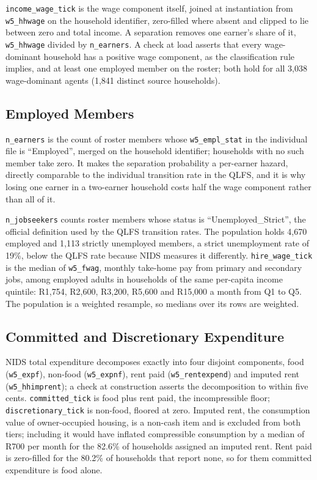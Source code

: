 \texttt{income\_wage\_tick} is the wage component itself, joined at instantiation from
\texttt{w5\_hhwage} on the household identifier, zero-filled where absent and clipped to lie
between zero and total income. A separation removes one earner's share of it,
\texttt{w5\_hhwage} divided by \texttt{n\_earners}. A check at load asserts that every
wage-dominant household has a positive wage component, as the classification rule implies, and at
least one employed member on the roster; both hold for all 3{,}038 wage-dominant agents
(1{,}841 distinct source households).

\subsection{Employed Members}\label{app:var-employed}

\texttt{n\_earners} is the count of roster members whose \texttt{w5\_empl\_stat} in the individual
file is ``Employed'', merged on the household identifier; households with no such member take
zero. It makes the separation probability a per-earner hazard, directly comparable to the
individual transition rate in the \ac{QLFS}, and it is why losing one earner in a two-earner
household costs half the wage component rather than all of it.

\texttt{n\_jobseekers} counts roster members whose status is ``Unemployed\_Strict'', the
official definition used by the \ac{QLFS} transition rates. The population holds 4{,}670
employed and 1{,}113 strictly unemployed members, a strict unemployment rate of 19\%, below the
\ac{QLFS} rate because \ac{NIDS} measures it differently. \texttt{hire\_wage\_tick} is the
median of \texttt{w5\_fwag}, monthly take-home pay from primary and secondary jobs, among
employed adults in households of the same per-capita income quintile: R1{,}754, R2{,}600,
R3{,}200, R5{,}600 and R15{,}000 a month from Q1 to Q5. The population is a weighted resample,
so medians over its rows are weighted.

\subsection{Committed and Discretionary Expenditure}\label{app:var-expenditure}

\ac{NIDS} total expenditure decomposes exactly into four disjoint components, food
(\texttt{w5\_expf}), non-food (\texttt{w5\_expnf}), rent paid (\texttt{w5\_rentexpend}) and
imputed rent (\texttt{w5\_hhimprent}); a check at construction asserts the decomposition to
within five cents. \texttt{committed\_tick} is food plus rent paid, the incompressible floor;
\texttt{discretionary\_tick} is non-food, floored at zero. Imputed rent, the consumption value of
owner-occupied housing, is a non-cash item and is excluded from both tiers; including it would
have inflated compressible consumption by a median of R700 per month for the 82.6\% of households
assigned an imputed rent. Rent paid is zero-filled for the 80.2\% of households that report none,
so for them committed expenditure is food alone.

